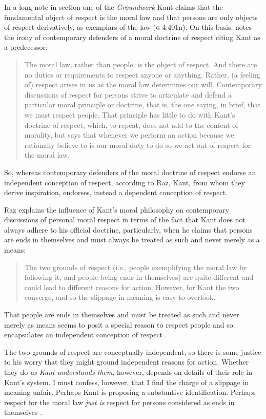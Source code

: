 \documentclass[a4paper,12pt]{article}
\begin{document}
In a long note in section one of the \emph{Groundwork} Kant claims that the fundamental object of respect is the moral law and that persons are only objects of respect derivatively, as exemplars of the law (\textsc{g} 4:401n). On this basis, \citet[131]{Raz:2001ps} notes the irony of contemporary defenders of a moral doctrine of respect citing Kant as a predecessor:
\begin{quote}
	The moral law, rather than people, is the object of respect. And there are no duties or requirements to respect anyone or anything. Rather, (a feeling of) respect arises in us as the moral law determines our will. Contemporary discussions of respect for persons strive to articulate and defend a particular moral principle or doctrine, that is, the one saying, in brief, that we must respect people. That principle has little to do with Kant's doctrine of respect, which, to repeat, does not add to the content of morality, but says that whenever we perform an action because we rationally believe to is our moral duty to do so we act out of respect for the moral law. \citep[134]{Raz:2001ps}
\end{quote}
So, whereas contemporary defenders of the moral doctrine of respect endorse an independent conception of respect, according to Raz, Kant, from whom they derive inspiration, endorses, instead a dependent conception of respect.

Raz explains the influence of Kant's moral philosophy on contemporary discussions of personal moral respect in terms of the fact that Kant does not always adhere to his official doctrine, particularly, when he claims that persons are ends in themselves and must always be treated as such and never merely as a means: 
\begin{quote}
	The two grounds of respect (i.e., people exemplifying the moral law by following it, and people being ends in themselves) are quite different and could lead to different reasons for action. However, for Kant the two converge, and so the slippage in meaning is easy to overlook. \citep[136]{Raz:2001ps} 
\end{quote}
That people are ends in themselves and must be treated as such and never merely as means seems to posit a special reason to respect people and so encapsulates an independent conception of respect \citep[for discussion relevant to the distinction Raz is drawing see][]{Darwall:1977ty,Frankena:1986sf}.

The two grounds of respect are conceptually independent, so there is some justice to his worry that they might ground independent reasons for action. Whether they do \emph{as Kant understands them}, however, depends on details of their role in Kant's system. I must confess, however, that I find the charge of a slippage in meaning unfair. Perhaps Kant is proposing a substantive identification. Perhaps respect for the moral law \emph{just is} respect for persons considered as ends in themselves \citep[see][for a similar suggestion]{Velleman:2006nx}. 
\end{document}
